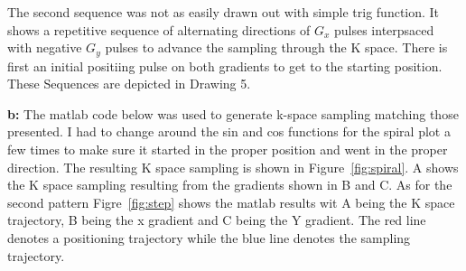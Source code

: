 \documentclass[12pt]{article}
\begin{document}
The second sequence was not as easily drawn out with simple trig function. It shows a repetitive sequence of alternating directions of $G_x$ pulses interpsaced with negative $G_y$ pulses to advance the sampling through the K space. There is first an initial positiing pulse on both gradients to get to the starting position. These Sequences are depicted in Drawing 5.

\noindent\textbf{b: }
The matlab code below was used to generate k-space sampling matching those presented. I had to change around the sin and cos functions for the spiral plot a few times to make sure it started in the proper position and went in the proper direction. The resulting K space sampling is shown in Figure~\ref{fig:spiral}. A shows the K space sampling resulting from the gradients shown in B and C. As for the second pattern Figre~\ref{fig:step} shows the matlab results wit A being the K space trajectory, B being the x gradient and C being the Y gradient. The red line denotes a positioning trajectory while the blue line denotes the sampling trajectory.
\end{document}
